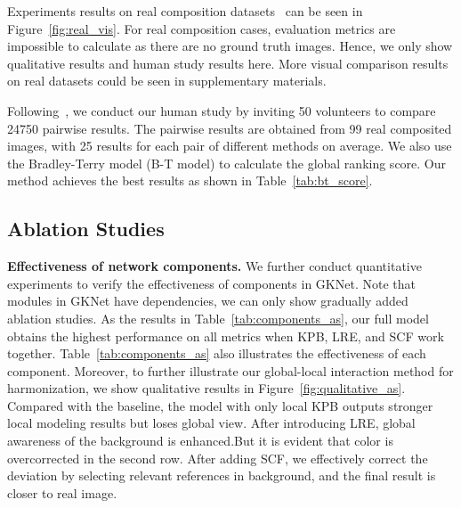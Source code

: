 \documentclass[10pt,twocolumn,letterpaper]{article}
\begin{document}
Experiments results on real composition datasets~\cite{Tsai_2017_CVPR} can be seen in Figure~\ref{fig:real_vis}. For real composition cases, evaluation metrics are impossible to calculate as there are no ground truth images. Hence, we only show qualitative results and human study results here. More visual comparison results on real datasets could be seen in supplementary materials. 

\begin{table}[ht]
  \centering
    \caption{B-T scores comparison on real composite images.}
  \label{tab:bt_score}\vspace{-1.0em}
\end{table}

Following~\cite{Cong_2020_CVPR,cong_2021_ICME,Guo_2021_CVPR,Hang_2022_CVPR}, we conduct our human study by inviting 50 volunteers to compare 24750 pairwise results. The pairwise results are obtained from 99 real composited images, with 25 results for each pair of different methods on average. We also use the Bradley-Terry model (B-T model) to calculate the global ranking score. Our method achieves the best results as shown in Table~\ref{tab:bt_score}.


\subsection{Ablation Studies}

\noindent \textbf{Effectiveness of network components.} We further conduct quantitative experiments to verify the effectiveness of components in GKNet. Note that modules in GKNet have dependencies, we can only show gradually added ablation studies.
As the results in Table~\ref{tab:components_as}, our full model obtains the highest performance on all metrics when KPB, LRE, and SCF work together. Table~\ref{tab:components_as} also illustrates the effectiveness of each component.
Moreover, to further illustrate our global-local interaction method for harmonization, we show qualitative results in Figure~\ref{fig:qualitative_as}. Compared with the baseline, the model with only local KPB outputs stronger local modeling results but loses global view. After introducing LRE, global awareness of the background is enhanced.But it is evident that color is overcorrected in the second row. After adding SCF, we effectively correct the deviation by selecting relevant references in background, and the final result is closer to real image.
\end{document}
